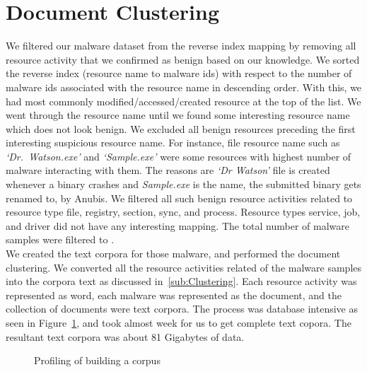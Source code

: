 \section{Document Clustering}
\label{sec:Document Clustering}
We filtered our malware dataset from the reverse index mapping by removing all resource activity that we confirmed as benign based on our knowledge.
We sorted the reverse index (resource name to malware ids) with respect to the number of malware ids associated with the resource name in descending order.
With this, we had most commonly modified/accessed/created resource at the top of the list.
We went through the resource name until we found some interesting resource name which does not look benign.
We excluded all benign resources preceding the first interesting suspicious resource name.
For instance, file resource name such as \emph{`Dr.\ Watson.exe'} and \emph{`Sample.exe'} were some resources with highest number of malware interacting with them.
The reasons are \emph{`Dr Watson'} file is created whenever a binary crashes and \emph{Sample.exe} is the name, the submitted binary gets renamed to, by Anubis.
We filtered all such benign resource activities related to resource type file, registry, section, sync, and process.
Resource types service, job, and driver did not have any interesting mapping.
The total number of malware samples were filtered to {\gettotalmalwareiii{}}.\\

We created the text corpora for those {\gettotalmalwareiii{}} malware, and performed the document clustering.
We converted all the resource activities related of the malware samples into the corpora text as discussed in~\autoref{sub:Clustering}.
Each resource activity was represented as word, each malware was represented as the document, and the collection of documents were text corpora.
The process was database intensive as seen in Figure~\ref{fig:actcreation}, and took almost week for us to get complete text copora.
The resultant text corpora was about 81 Gigabytes of data.
\begin{figure}[ht]
    \centering
    \def\svgwidth{\columnwidth}
    \scalebox{1}{}
\caption{Profiling of building a corpus}
\label{fig:actcreation}
\end{figure}
\\
